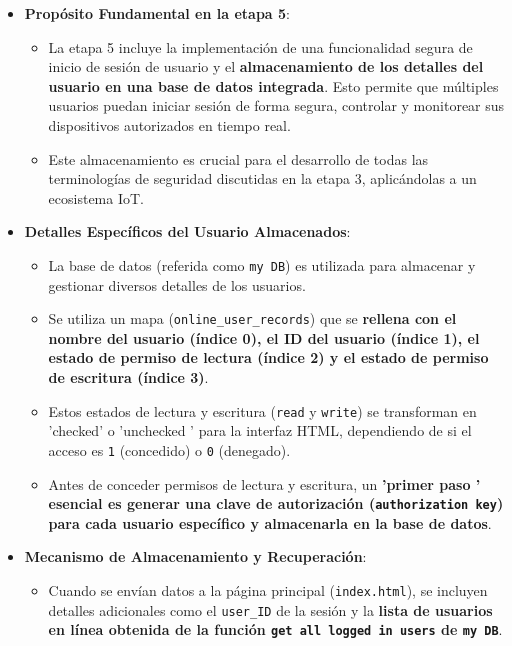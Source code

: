 \documentclass{report}
\begin{document}
\begin{itemize}
    \item \textbf{Propósito Fundamental en la etapa 5}:
    \begin{itemize}
        \item La etapa 5 incluye la implementación de una funcionalidad segura de inicio de sesión de usuario y el \textbf{almacenamiento de los 
        detalles del usuario en una base de datos integrada}. Esto permite que múltiples usuarios puedan iniciar sesión de forma segura, controlar 
        y monitorear sus dispositivos autorizados en tiempo real.
        \item Este almacenamiento es crucial para el desarrollo de todas las terminologías de seguridad discutidas en la etapa 3, aplicándolas 
        a un ecosistema IoT.
    \end{itemize}
    \item \textbf{Detalles Específicos del Usuario Almacenados}:
    \begin{itemize}
    \item La base de datos (referida como \texttt{my DB}) es utilizada para almacenar y gestionar diversos detalles de los usuarios.
        \item Se utiliza un mapa (\verb|online_user_records|) que se \textbf{rellena con el nombre del usuario (índice 0), el ID del usuario (índice 1), 
        el estado de permiso de lectura (índice 2) y el estado de permiso de escritura (índice 3)}.
        \item Estos estados de lectura y escritura (\texttt{read} y \texttt{write}) se transforman en 'checked' o  'unchecked ' para la interfaz HTML, 
        dependiendo de si el acceso es \texttt{1} (concedido) o \texttt{0} (denegado).
        \item Antes de conceder permisos de lectura y escritura, un \textbf{ 'primer paso ' esencial es generar una clave de autorización 
        (\texttt{authorization key}) para cada usuario específico y almacenarla en la base de datos}.
    \end{itemize}
    \item \textbf{Mecanismo de Almacenamiento y Recuperación}:
    \begin{itemize}
        \item Cuando se envían datos a la página principal (\verb|index.html|), se incluyen detalles adicionales como el \verb|user_ID| de la sesión y 
        la \textbf{lista de usuarios en línea obtenida de la función \texttt{get all logged in users} de \texttt{my DB}}.

\end{itemize}
\end{itemize}
\end{document}
